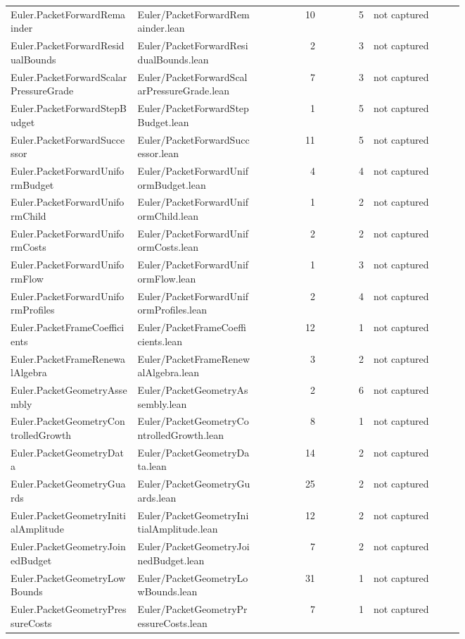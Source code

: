 \documentclass[10pt]{article}
\begin{document}
\begin{longtable}{p{0.28\linewidth}p{0.27\linewidth}r r p{0.20\linewidth}}
Euler.PacketForwardRemainder & Euler/PacketForwardRemainder.lean & 10 & 5 & not captured\\
Euler.PacketForwardResidualBounds & Euler/PacketForwardResidualBounds.lean & 2 & 3 & not captured\\
Euler.PacketForwardScalarPressureGrade & Euler/PacketForwardScalarPressureGrade.lean & 7 & 3 & not captured\\
Euler.PacketForwardStepBudget & Euler/PacketForwardStepBudget.lean & 1 & 5 & not captured\\
Euler.PacketForwardSuccessor & Euler/PacketForwardSuccessor.lean & 11 & 5 & not captured\\
Euler.PacketForwardUniformBudget & Euler/PacketForwardUniformBudget.lean & 4 & 4 & not captured\\
Euler.PacketForwardUniformChild & Euler/PacketForwardUniformChild.lean & 1 & 2 & not captured\\
Euler.PacketForwardUniformCosts & Euler/PacketForwardUniformCosts.lean & 2 & 2 & not captured\\
Euler.PacketForwardUniformFlow & Euler/PacketForwardUniformFlow.lean & 1 & 3 & not captured\\
Euler.PacketForwardUniformProfiles & Euler/PacketForwardUniformProfiles.lean & 2 & 4 & not captured\\
Euler.PacketFrameCoefficients & Euler/PacketFrameCoefficients.lean & 12 & 1 & not captured\\
Euler.PacketFrameRenewalAlgebra & Euler/PacketFrameRenewalAlgebra.lean & 3 & 2 & not captured\\
Euler.PacketGeometryAssembly & Euler/PacketGeometryAssembly.lean & 2 & 6 & not captured\\
Euler.PacketGeometryControlledGrowth & Euler/PacketGeometryControlledGrowth.lean & 8 & 1 & not captured\\
Euler.PacketGeometryData & Euler/PacketGeometryData.lean & 14 & 2 & not captured\\
Euler.PacketGeometryGuards & Euler/PacketGeometryGuards.lean & 25 & 2 & not captured\\
Euler.PacketGeometryInitialAmplitude & Euler/PacketGeometryInitialAmplitude.lean & 12 & 2 & not captured\\
Euler.PacketGeometryJoinedBudget & Euler/PacketGeometryJoinedBudget.lean & 7 & 2 & not captured\\
Euler.PacketGeometryLowBounds & Euler/PacketGeometryLowBounds.lean & 31 & 1 & not captured\\
Euler.PacketGeometryPressureCosts & Euler/PacketGeometryPressureCosts.lean & 7 & 1 & not captured\\

\end{longtable}
\end{document}
